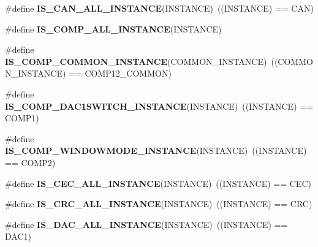 \begin{DoxyCompactItemize}
\item 
\mbox{\label{group___exported__macro_ga974dd363bcb2a5f48ec032509fd4ece3}} 
\#define {\bfseries I\+S\+\_\+\+C\+A\+N\+\_\+\+A\+L\+L\+\_\+\+I\+N\+S\+T\+A\+N\+CE}(I\+N\+S\+T\+A\+N\+CE)~((I\+N\+S\+T\+A\+N\+CE) == C\+AN)
\item 
\#define {\bfseries I\+S\+\_\+\+C\+O\+M\+P\+\_\+\+A\+L\+L\+\_\+\+I\+N\+S\+T\+A\+N\+CE}(I\+N\+S\+T\+A\+N\+CE)
\item 
\mbox{\label{group___exported__macro_gaa7c8a0729f6b2a35ce000556078fa737}} 
\#define {\bfseries I\+S\+\_\+\+C\+O\+M\+P\+\_\+\+C\+O\+M\+M\+O\+N\+\_\+\+I\+N\+S\+T\+A\+N\+CE}(C\+O\+M\+M\+O\+N\+\_\+\+I\+N\+S\+T\+A\+N\+CE)~((C\+O\+M\+M\+O\+N\+\_\+\+I\+N\+S\+T\+A\+N\+CE) == C\+O\+M\+P12\+\_\+\+C\+O\+M\+M\+ON)
\item 
\mbox{\label{group___exported__macro_gaf2340c4592a47c171624fc99e43e4da5}} 
\#define {\bfseries I\+S\+\_\+\+C\+O\+M\+P\+\_\+\+D\+A\+C1\+S\+W\+I\+T\+C\+H\+\_\+\+I\+N\+S\+T\+A\+N\+CE}(I\+N\+S\+T\+A\+N\+CE)~((I\+N\+S\+T\+A\+N\+CE) == C\+O\+M\+P1)
\item 
\mbox{\label{group___exported__macro_gab7f78e841f84bf7ec834748ca685fbc0}} 
\#define {\bfseries I\+S\+\_\+\+C\+O\+M\+P\+\_\+\+W\+I\+N\+D\+O\+W\+M\+O\+D\+E\+\_\+\+I\+N\+S\+T\+A\+N\+CE}(I\+N\+S\+T\+A\+N\+CE)~((I\+N\+S\+T\+A\+N\+CE) == C\+O\+M\+P2)
\item 
\mbox{\label{group___exported__macro_ga10cad35fdea5ffcb9f17973ce98c7dee}} 
\#define {\bfseries I\+S\+\_\+\+C\+E\+C\+\_\+\+A\+L\+L\+\_\+\+I\+N\+S\+T\+A\+N\+CE}(I\+N\+S\+T\+A\+N\+CE)~((I\+N\+S\+T\+A\+N\+CE) == C\+EC)
\item 
\mbox{\label{group___exported__macro_gaa514941a7f02f65eb27450c05e4e8dd1}} 
\#define {\bfseries I\+S\+\_\+\+C\+R\+C\+\_\+\+A\+L\+L\+\_\+\+I\+N\+S\+T\+A\+N\+CE}(I\+N\+S\+T\+A\+N\+CE)~((I\+N\+S\+T\+A\+N\+CE) == C\+RC)
\item 
\mbox{\label{group___exported__macro_ga94426b97cc5f1644d67f291cbcdba6d8}} 
\#define {\bfseries I\+S\+\_\+\+D\+A\+C\+\_\+\+A\+L\+L\+\_\+\+I\+N\+S\+T\+A\+N\+CE}(I\+N\+S\+T\+A\+N\+CE)~((I\+N\+S\+T\+A\+N\+CE) == D\+A\+C1)

\end{DoxyCompactItemize}
